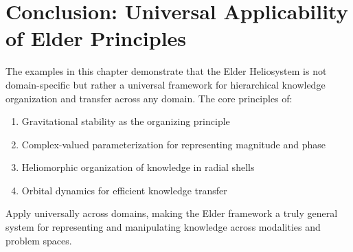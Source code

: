 \section{Conclusion: Universal Applicability of Elder Principles}

The examples in this chapter demonstrate that the Elder Heliosystem is not domain-specific but rather a universal framework for hierarchical knowledge organization and transfer across any domain. The core principles of:

\begin{enumerate}
    \item Gravitational stability as the organizing principle
    \item Complex-valued parameterization for representing magnitude and phase
    \item Heliomorphic organization of knowledge in radial shells
    \item Orbital dynamics for efficient knowledge transfer
\end{enumerate}

Apply universally across domains, making the Elder framework a truly general system for representing and manipulating knowledge across modalities and problem spaces.